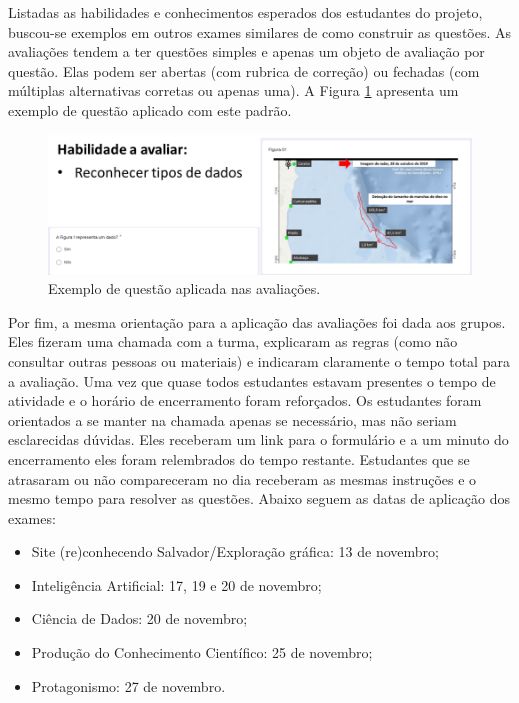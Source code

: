 \documentclass[
]{book}
\providecommand{\tightlist}{%
  \setlength{\itemsep}{0pt}\setlength{\parskip}{0pt}}
\begin{document}
Listadas as habilidades e conhecimentos esperados dos estudantes do projeto, buscou-se exemplos em outros exames similares de como construir as questões. As avaliações tendem a ter questões simples e apenas um objeto de avaliação por questão. Elas podem ser abertas (com rubrica de correção) ou fechadas (com múltiplas alternativas corretas ou apenas uma). A Figura \ref{fig:impacto03} apresenta um exemplo de questão aplicado com este padrão.

\begin{figure}

{\centering \includegraphics[width=1\linewidth,height=0.8\textheight]{images/Impactos/03} 

}

\caption{Exemplo de questão aplicada nas avaliações.}\label{fig:impacto03}
\end{figure}

Por fim, a mesma orientação para a aplicação das avaliações foi dada aos grupos. Eles fizeram uma chamada com a turma, explicaram as regras (como não consultar outras pessoas ou materiais) e indicaram claramente o tempo total para a avaliação. Uma vez que quase todos estudantes estavam presentes o tempo de atividade e o horário de encerramento foram reforçados. Os estudantes foram orientados a se manter na chamada apenas se necessário, mas não seriam esclarecidas dúvidas. Eles receberam um link para o formulário e a um minuto do encerramento eles foram relembrados do tempo restante. Estudantes que se atrasaram ou não compareceram no dia receberam as mesmas instruções e o mesmo tempo para resolver as questões. Abaixo seguem as datas de aplicação dos exames:

\begin{itemize}
\tightlist
\item
  Site (re)conhecendo Salvador/Exploração gráfica: 13 de novembro;
\item
  Inteligência Artificial: 17, 19 e 20 de novembro;
\item
  Ciência de Dados: 20 de novembro;
\item
  Produção do Conhecimento Científico: 25 de novembro;
\item
  Protagonismo: 27 de novembro.
\end{itemize}
\end{document}
